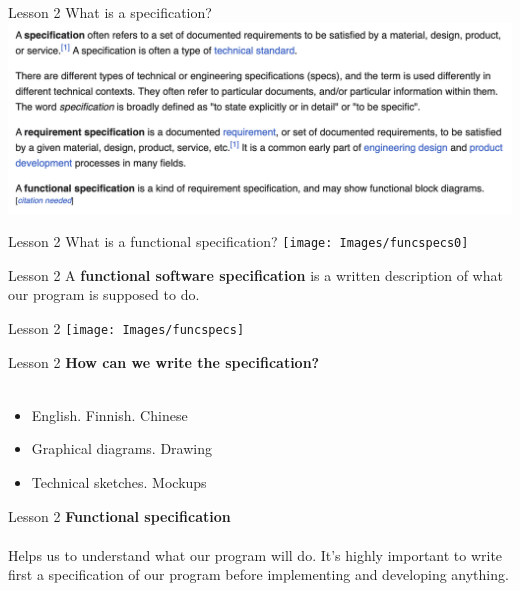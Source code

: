 \documentclass[aspectratio=1610]{beamer}
\begin{document}
\begin{frame}{Lesson 2}{}
\Huge{What is a specification?}
\includegraphics[scale=0.52]{Images/specs}
\end{frame}


\begin{frame}{Lesson 2}{}
\Huge{What is a functional specification?}
\texttt{[image: Images/funcspecs0]}
\end{frame}


\begin{frame}{Lesson 2}{}
\huge
    A \textbf{functional software specification} is a
    \alert{written} description of what our program is supposed to do.
\end{frame}


\begin{frame}{Lesson 2}{}
\texttt{[image: Images/funcspecs]}
\end{frame}



\begin{frame}{Lesson 2}{}
\LARGE
\textbf{How can we write the specification?}\\~\\
\begin{itemize}
    \item English. Finnish. Chinese
    \item Graphical diagrams. Drawing
    \item Technical sketches. Mockups
\end{itemize}
\end{frame}


\begin{frame}{Lesson 2}{}
\LARGE
\textbf{Functional specification}\\~\\
Helps us to understand what our program will do. It’s highly important to write first a specification of our program \alert{before}  implementing and developing anything.
\end{frame}
\end{document}
